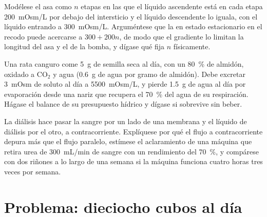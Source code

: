 \begin{exercise}[$\star\star\star$]\label{exo:b3:renal-osmoregulation:10}
Modélese el asa como $n$ etapas en las que el líquido ascendente está
en cada etapa \qty{200}{mOsm/L} por debajo del intersticio y el líquido
descendente lo iguala, con el líquido entrando a \qty{300}{mOsm/L}.
Arguméntese que la  en estado estacionario en el recodo
puede acercarse a $300 +
200n$, de modo que el gradiente lo limitan la longitud del asa y el
 de la bomba, y dígase qué fija $n$ físicamente.
\end{exercise}

\begin{exercise}[$\star\star\star$]\label{exo:b3:renal-osmoregulation:11}
Una rata canguro come \qty{5}{g} de semilla seca al día, con un
\qty{80}{\%} de almidón, oxidado a CO$_{2}$ y agua (\qty{0.6}{g} de
agua por gramo de almidón). Debe excretar \qty{3}{mOsm} de soluto al
día a \qty{5500}{mOsm/L}, y pierde \qty{1.5}{g} de agua al día por
evaporación desde una nariz que recupera el \qty{70}{\%} del agua de su
respiración. Hágase el balance de su presupuesto hídrico y dígase si
sobrevive sin beber.
\end{exercise}

\begin{exercise}[$\star\star\star$]\label{exo:b3:renal-osmoregulation:12}
La diálisis hace pasar la sangre por un lado de una membrana y el
líquido de diálisis por el otro, a contracorriente. Explíquese por qué
el flujo a contracorriente depura más que el flujo paralelo, estímese
el aclaramiento de una máquina que retira urea de \qty{300}{mL/min} de
sangre con un rendimiento del \qty{70}{\%}, y compárese con dos riñones
a lo largo de una semana si la máquina funciona cuatro horas tres veces
por semana.
\end{exercise}

\section{Problema: dieciocho cubos al día}

